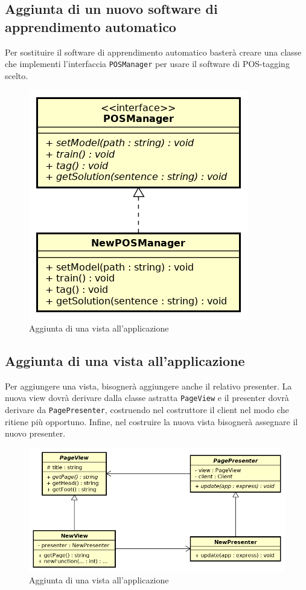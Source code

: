 \subsection{Aggiunta di un nuovo software di apprendimento automatico}
Per sostituire il software di apprendimento automatico basterà creare una classe che implementi l'interfaccia \texttt{POSManager} per usare il software di POS-tagging scelto.
\begin{figure}[ht]
	\centering
	\includegraphics[scale=0.75]{images/newPOS.png}
	\caption{Aggiunta di una vista all'applicazione}
\end{figure}

\subsection{Aggiunta di una vista all'applicazione}
Per aggiungere una vista, bisognerà aggiungere anche il relativo presenter. La nuova view dovrà derivare dalla classe astratta \texttt{PageView} e il presenter dovrà derivare da \texttt{PagePresenter}, costruendo nel costruttore il client nel modo che ritiene più opportuno. Infine, nel costruire la nuova vista bisognerà assegnare il nuovo presenter.
\begin{figure}[ht]
	\includegraphics[scale=0.75]{images/newview.png}
	\caption{Aggiunta di una vista all'applicazione}
\end{figure}

